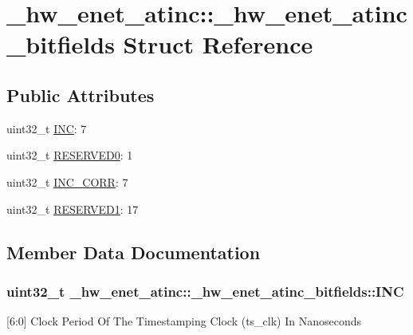 \hypertarget{struct__hw__enet__atinc_1_1__hw__enet__atinc__bitfields}{}\section{\+\_\+hw\+\_\+enet\+\_\+atinc\+:\+:\+\_\+hw\+\_\+enet\+\_\+atinc\+\_\+bitfields Struct Reference}
\label{struct__hw__enet__atinc_1_1__hw__enet__atinc__bitfields}
\subsection*{Public Attributes}
\begin{DoxyCompactItemize}
\item 
uint32\+\_\+t \hyperlink{struct__hw__enet__atinc_1_1__hw__enet__atinc__bitfields_a3362256ced832414fbd87766f0e7ae32}{I\+NC}\+: 7
\item 
uint32\+\_\+t \hyperlink{struct__hw__enet__atinc_1_1__hw__enet__atinc__bitfields_a546dc949037ade4fc27cc9a125bfa058}{R\+E\+S\+E\+R\+V\+E\+D0}\+: 1
\item 
uint32\+\_\+t \hyperlink{struct__hw__enet__atinc_1_1__hw__enet__atinc__bitfields_ac4e8177f7db402bcd480085fd34e0df9}{I\+N\+C\+\_\+\+C\+O\+RR}\+: 7
\item 
uint32\+\_\+t \hyperlink{struct__hw__enet__atinc_1_1__hw__enet__atinc__bitfields_ad1466a83dfc9532a2d18ae3734b3bf86}{R\+E\+S\+E\+R\+V\+E\+D1}\+: 17
\end{DoxyCompactItemize}


\subsection{Member Data Documentation}
\subsubsection[{\texorpdfstring{I\+NC}{INC}}]{\setlength{\rightskip}{0pt plus 5cm}uint32\+\_\+t \+\_\+hw\+\_\+enet\+\_\+atinc\+::\+\_\+hw\+\_\+enet\+\_\+atinc\+\_\+bitfields\+::\+I\+NC}\hypertarget{struct__hw__enet__atinc_1_1__hw__enet__atinc__bitfields_a3362256ced832414fbd87766f0e7ae32}{}\label{struct__hw__enet__atinc_1_1__hw__enet__atinc__bitfields_a3362256ced832414fbd87766f0e7ae32}
\mbox{[}6\+:0\mbox{]} Clock Period Of The Timestamping Clock (ts\+\_\+clk) In Nanoseconds 
